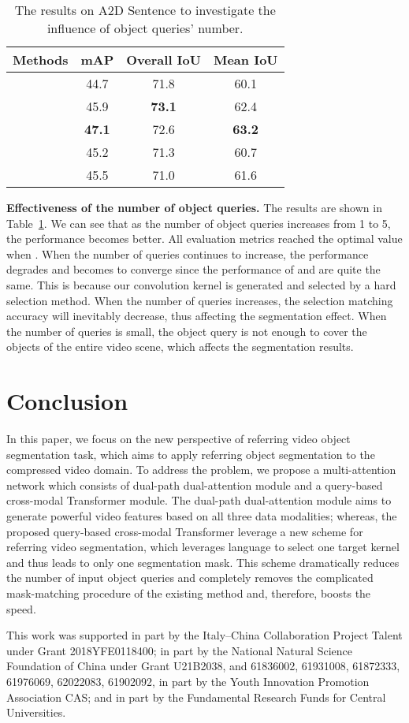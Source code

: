 \documentclass[sigconf]{acmart}
\begin{document}
\begin{table}[t]
\centering
\begin{tabular}{cccc}
\hline
\hline
Methods &mAP &Overall IoU &Mean IoU\\
\hline
  &44.7    &71.8  &60.1\\
  &45.9    &\textbf{73.1}  &62.4\\
  &\textbf{47.1}  &72.6 &\textbf{63.2}\\
  &45.2    &71.3  &60.7\\
  &45.5    &71.0  &61.6  \\
\hline
\hline
\end{tabular}
\caption{The results on A2D Sentence to investigate the influence of object queries' number.}
\label{Table6}
\end{table}

{\textbf{Effectiveness of the number of object queries.}} The results are shown in Table~\ref{Table6}. We can see that as the number of object queries increases from 1 to 5, the performance becomes better. All evaluation metrics reached the optimal value when . When the number of queries continues to increase, the performance degrades and becomes to converge since the performance of  and  are quite the same. This is because our convolution kernel is generated and selected by a hard selection method. When the number of queries increases, the selection matching accuracy will inevitably decrease, thus affecting the segmentation effect. When the number of queries is small, the object query is not enough to cover the objects of the entire video scene, which affects the segmentation results.

\section{Conclusion}
In this paper, we focus on the new perspective of referring video object segmentation task, which aims to apply referring object segmentation to the compressed video domain. To address the problem, we propose a multi-attention network which consists of dual-path dual-attention module and a query-based cross-modal Transformer module. The dual-path dual-attention module aims to generate powerful video features based on all three data modalities; whereas, the proposed query-based cross-modal Transformer leverage a new scheme for referring video segmentation, which leverages language to select one target kernel and thus leads to only one segmentation mask. This scheme dramatically reduces the number of input object queries and completely removes the complicated mask-matching procedure of the existing method and, therefore, boosts the speed.

\begin{acks}
This work was supported in part by the Italy–China Collaboration Project Talent under Grant 2018YFE0118400; in part by the National Natural Science Foundation of China under Grant U21B2038, and 61836002, 61931008, 61872333, 61976069, 62022083, 61902092, in part by the Youth Innovation Promotion Association CAS; and in part by the Fundamental Research Funds for Central Universities.
\end{acks}


\end{document}
